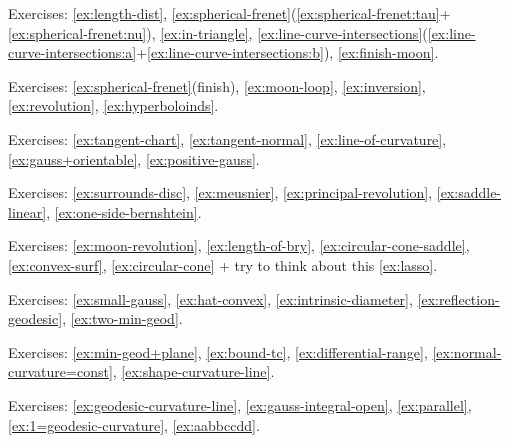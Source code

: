 \noindent{\rule{\textwidth}{.1mm}}


Exercises:
\ref{ex:length-dist},
\ref{ex:spherical-frenet}(\ref{ex:spherical-frenet:tau}+\ref{ex:spherical-frenet:nu}),
\ref{ex:in-triangle},
\ref{ex:line-curve-intersections}(\ref{ex:line-curve-intersections:a}+\ref{ex:line-curve-intersections:b}),
\ref{ex:finish-moon}.

Exercises:
\ref{ex:spherical-frenet}(finish),
\ref{ex:moon-loop},
\ref{ex:inversion},
\ref{ex:revolution},
\ref{ex:hyperboloinds}.

Exercises:
\ref{ex:tangent-chart},
\ref{ex:tangent-normal},
\ref{ex:line-of-curvature},
\ref{ex:gauss+orientable},
\ref{ex:positive-gauss}.

Exercises:
\ref{ex:surrounds-disc},
\ref{ex:meusnier},
\ref{ex:principal-revolution},
\ref{ex:saddle-linear},
\ref{ex:one-side-bernshtein}.

Exercises:
\ref{ex:moon-revolution}, 
\ref{ex:length-of-bry},
\ref{ex:circular-cone-saddle},
\ref{ex:convex-surf},
\ref{ex:circular-cone} 
+ try to think about this \ref{ex:lasso}.

Exercises:
\ref{ex:small-gauss},
\ref{ex:hat-convex},
\ref{ex:intrinsic-diameter},
\ref{ex:reflection-geodesic},
\ref{ex:two-min-geod}.

Exercises:
\ref{ex:min-geod+plane},
\ref{ex:bound-tc},
\ref{ex:differential-range},
\ref{ex:normal-curvature=const},
\ref{ex:shape-curvature-line}.

Exercises: 
\ref{ex:geodesic-curvature-line},
\ref{ex:gauss-integral-open},
\ref{ex:parallel},
\ref{ex:1=geodesic-curvature},
\ref{ex:aabbccdd}.


\noindent{\rule{\textwidth}{.1mm}}

